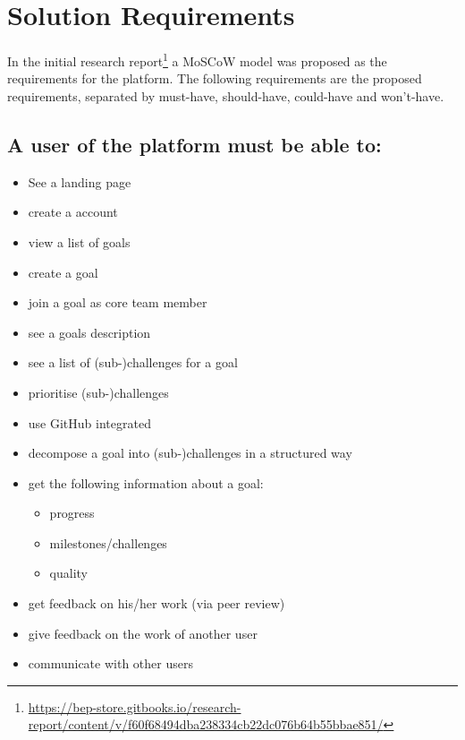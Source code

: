 \chapter{Solution Requirements}\label{app:solution_req}

In the initial research report\footnote{\url{https://bep-store.gitbooks.io/research-report/content/v/f60f68494dba238334cb22dc076b64b55bbae851/}} a MoSCoW model  was proposed as the requirements for the platform. The following requirements are the proposed requirements, separated by must-have, should-have, could-have and won't-have. 

\section*{A user of the platform must be able to:}
\begin{itemize}[nosep]
    \item See a landing page
    \item create a account
    \item view a list of goals
    \item create a goal
    \item join a goal as core team member
    \item see a goals description
    \item see a list of (sub-)challenges for a goal
    \item prioritise (sub-)challenges
    \item use GitHub integrated
    \item decompose a goal into (sub-)challenges in a structured way 
    \item get the following information about a goal:
        \begin{itemize}
            \item progress
            \item milestones/challenges
            \item quality
        \end{itemize}
    \item get feedback on his/her work (via peer review)
    \item give feedback on the work of another user
    \item communicate with other users
\end{itemize}
